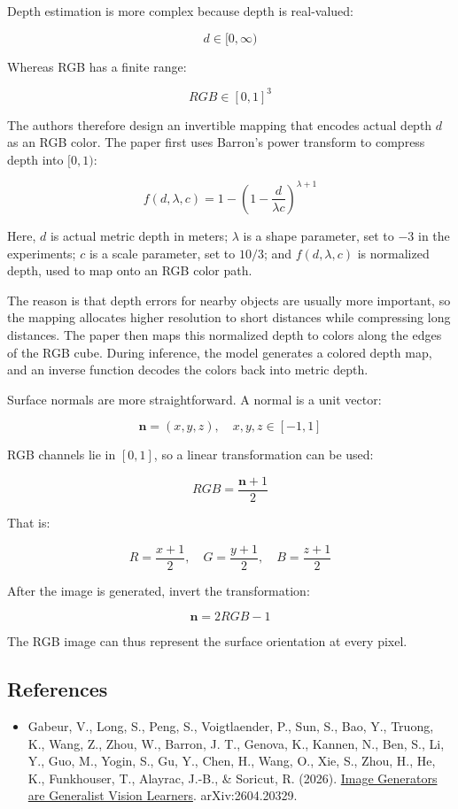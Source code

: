 Depth estimation is more complex because depth is real-valued:

\[
d \in [0, \infty)
\]

Whereas RGB has a finite range:

\[
RGB \in [0, 1]^3
\]

The authors therefore design an invertible mapping that encodes actual depth \(d\) as an RGB color. The paper first uses Barron's power transform to compress depth into \([0, 1)\):

\[
f(d, \lambda, c) = 1 - \left(1 - \frac{d}{\lambda c}\right)^{\lambda + 1}
\]

Here, \(d\) is actual metric depth in meters; \(\lambda\) is a shape parameter, set to \(-3\) in the experiments; \(c\) is a scale parameter, set to \(10/3\); and \(f(d,\lambda,c)\) is normalized depth, used to map onto an RGB color path.

The reason is that depth errors for nearby objects are usually more important, so the mapping allocates higher resolution to short distances while compressing long distances. The paper then maps this normalized depth to colors along the edges of the RGB cube. During inference, the model generates a colored depth map, and an inverse function decodes the colors back into metric depth.

Surface normals are more straightforward. A normal is a unit vector:

\[
\mathbf{n} = (x, y, z), \quad x, y, z \in [-1, 1]
\]

RGB channels lie in \([0, 1]\), so a linear transformation can be used:

\[
RGB = \frac{\mathbf{n} + 1}{2}
\]

That is:

\[
R = \frac{x + 1}{2}, \quad G = \frac{y + 1}{2}, \quad B = \frac{z + 1}{2}
\]

After the image is generated, invert the transformation:

\[
\mathbf{n} = 2RGB - 1
\]

The RGB image can thus represent the surface orientation at every pixel.

\FloatBarrier
{}
\hypertarget{references-149}{%
\subsection{References}\label{references-149}}

\vspace{0.25em}
\begin{itemize}
\tightlist
\item
  Gabeur, V., Long, S., Peng, S., Voigtlaender, P., Sun, S., Bao, Y., Truong, K., Wang, Z., Zhou, W., Barron, J. T., Genova, K., Kannen, N., Ben, S., Li, Y., Guo, M., Yogin, S., Gu, Y., Chen, H., Wang, O., Xie, S., Zhou, H., He, K., Funkhouser, T., Alayrac, J.-B., \& Soricut, R. (2026). \href{https://arxiv.org/abs/2604.20329}{Image Generators are Generalist Vision Learners}. arXiv:2604.20329.
\end{itemize}

\clearpage
